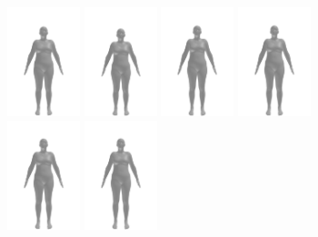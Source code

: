 \begin{figure}[h]
	\centering
	\begin{subfigure}{\textwidth}
		\centering
		\includegraphics[width=60pt]{files/patients/9_2}
		\includegraphics[width=60pt]{files/patients/9_3}
		\includegraphics[width=60pt]{files/patients/9_4}
		\includegraphics[width=60pt]{files/patients/9_5}
		\includegraphics[width=60pt]{files/patients/9_6}
		\hspace{10pt}
		\includegraphics[width=60pt]{files/patients/9_predicted}

\end{subfigure}
\end{figure}
